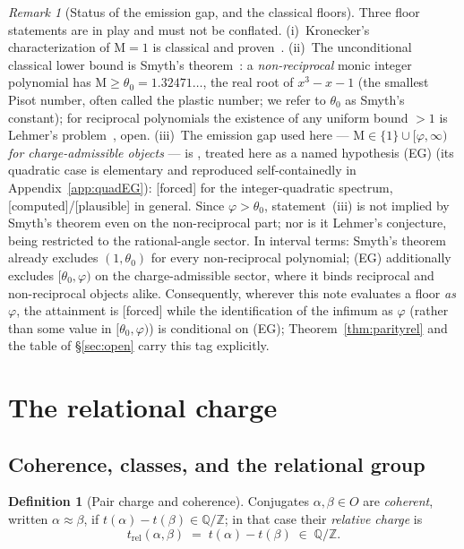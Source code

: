 \documentclass[11pt]{article}
\theoremstyle{plain}
\theoremstyle{definition}
\newtheorem{definition}[theorem]{Definition}
\theoremstyle{remark}
\newtheorem{remark}[theorem]{Remark}
\newcommand{\Q}{\mathbb{Q}}
\newcommand{\Z}{\mathbb{Z}}
\newcommand{\Mah}{\mathrm{M}}
\newcommand{\tors}{\Q/\Z}
\newcommand{\F}{\textnormal{[forced]}}
\newcommand{\C}{\textnormal{[computed]}}
\newcommand{\Pl}{\textnormal{[plausible]}}
\begin{document}
\begin{remark}[Status of the emission gap, and the classical floors]
\label{rem:gapstatus}
Three floor statements are in play and must not be conflated.
(i)~Kronecker's characterization of $\Mah=1$ is classical and
proven~\cite{Kronecker}. (ii)~The unconditional classical lower bound is
Smyth's theorem~\cite{Smyth}: a \emph{non-reciprocal} monic integer
polynomial has $\Mah\ge\theta_0=1.32471\ldots$, the real root of $x^3-x-1$
(the smallest Pisot number, often called the plastic number; we refer to
$\theta_0$ as Smyth's constant); for reciprocal polynomials the existence of any uniform bound $>1$ is
Lehmer's problem~\cite{Lehmer}, open. (iii)~The emission gap used here ---
$\Mah\in\{1\}\cup[\varphi,\infty)$ \emph{for charge-admissible objects} ---
is \cite[Prop.~2.3]{CMC}, treated here as a named hypothesis \textup{(EG)}
(its quadratic case is elementary and reproduced self-containedly in
Appendix~\ref{app:quadEG}):
\F{} for the integer-quadratic spectrum, \C/\Pl{} in general. Since $\varphi>\theta_0$, statement~(iii) is not implied by
Smyth's theorem even on the non-reciprocal part; nor is it Lehmer's
conjecture, being restricted to the rational-angle sector. In interval
terms: Smyth's theorem already excludes $(1,\theta_0)$ for every
non-reciprocal polynomial; \textup{(EG)} additionally excludes
$[\theta_0,\varphi)$ on the charge-admissible sector, where it binds
reciprocal and non-reciprocal objects alike. Consequently,
wherever this note evaluates a floor \emph{as} $\varphi$, the attainment is
\F{} while the identification of the infimum as $\varphi$ (rather than some
value in $[\theta_0,\varphi)$) is conditional on \textup{(EG)};
Theorem~\ref{thm:parityrel} and the table of \S\ref{sec:open} carry this
tag explicitly.
\end{remark}

\section{The relational charge}\label{sec:relational}

\subsection{Coherence, classes, and the relational group}

\begin{definition}[Pair charge and coherence]\label{def:pair}
Conjugates $\alpha,\beta\in O$ are \emph{coherent}, written $\alpha\approx\beta$,
if $t(\alpha)-t(\beta)\in\tors$; in that case their \emph{relative charge} is
\[
t_{\mathrm{rel}}(\alpha,\beta)\;=\;t(\alpha)-t(\beta)\;\in\;\tors .
\]
\end{definition}
\end{document}
